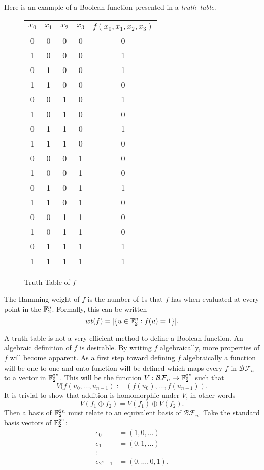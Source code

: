\par Here is an example of a Boolean function presented in a {\em truth\ table}.
\begin{figure}\label{fig:truth-table}
  \begin{tabular}{|c|c|c|c|c|}
    \hline
    $x_0$&$x_1$&$x_2$&$x_3$&$f(x_0,x_1,x_2,x_3)$\\
    \hline
    0&0&0&0&0\\
    1&0&0&0&1\\
    0&1&0&0&1\\
    1&1&0&0&0\\
    0&0&1&0&1\\
    1&0&1&0&0\\
    0&1&1&0&1\\
    1&1&1&0&0\\
    0&0&0&1&0\\
    1&0&0&1&0\\
    0&1&0&1&1\\
    1&1&0&1&0\\
    0&0&1&1&0\\
    1&0&1&1&0\\
    0&1&1&1&1\\
    1&1&1&1&1\\
  	\hline
	\end{tabular}
	\caption{Truth Table of $f$}
\end{figure}
\par The Hamming weight of $f$ is the number of 1s that $f$ has when evaluated
at every point in the $\mathbb{F}_2^n$. Formally, this can be written
\[
wt(f)=\lvert\{u\in\mathbb{F}_2^n:f(u)=1\}\rvert.
\]
\par A truth table is not a very efficient method to define a Boolean function.
An algebraic definition of $f$ is desirable. By writing $f$ algebraically, more
properties of $f$ will become apparent. As a first step toward defining $f$
algebraically a function will be one-to-one and onto function will be defined
which maps every $f$ in $\mathcal{BF}_n$ to a vector in $\mathbb{F}_2^{2^n}$. This
will be the function $V:\mathcal{BF}_n\rightarrow\mathbb{F}_2^{2^n}$ such that
\begin{equation}\label{eqn:bool-vector}
V(f(u_0,\dots,u_{n-1}):=(f(u_0),\dots,f(u_{n-1})).
\end{equation}
It is trivial to show that addition is homomorphic under $V$, in other words
\[
V(f_1\oplus f_2)=V(f_1)\oplus V(f_2).
\]
Then a basis of $\mathbb{F}_2^{2n}$ must relate to an equivalent basis of
$\mathcal{BF}_n$. Take the standard basis vectors of $\mathbb{F}_2^{2^n}$:
\begin{align*}
	e_0&=(1,0,\dots)\\
	e_1&=(0,1,\dots)\\
	\vdots \\
	e_{2^n-1}&=(0,\dots,0,1).
\end{align*}

